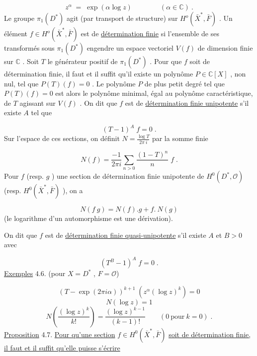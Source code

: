 \begin{equation*}
z^\alpha \;=\; \exp(\alpha \log z) \qquad\qquad (\alpha \in \mathbb{C}) \ .
\end{equation*}
Le groupe $\pi_1(D^*)$ agit (par transport de structure) sur $H^o(\bar{X}^*, \bar{F})$ . Un élément $f \in H^o(\bar{X}^*, \bar{F})$ est de \underline{détermination finie} si l'ensemble de ses transformés sous $\pi_1(D^*)$ engendre un espace vectoriel $V(f)$ de dimension finie sur $\mathbb{C}$ . Soit $T$ le générateur positif de $\pi_1(D^*)$ . Pour que $f$ soit de détermination finie,
il faut et il suffit qu'il existe un polynôme $P \in \mathbb{C}[X]$ , non nul, tel que $P(T)(f) = 0$ . Le polynôme $P$ de plus petit degré tel que $P(T)(f) = 0$ est alors le polynôme minimal, égal au polynôme caractéristique, de $T$ agissant sur $V(f)$ . On dit que $f$ est de \underline{détermination finie unipotente} s'il existe $A$ tel que

\begin{equation*}
(T-1)^A \; f = 0 \; .
\end{equation*}
Sur l'espace de ces sections, on définit $N = \frac{\log T}{2\pi\ i}$ par la somme finie

\begin{equation*}
N(f) = \frac{-1}{2\pi i} \sum_{n > 0} \frac{(1-T)^n}{n} \; f \; .
\end{equation*}
Pour $f$ (resp. $g$ ) une section de détermination finie unipotente de $H^0(D^*, \mathcal{O})$ (resp. $H^0(\bar{X}^*, \bar{F})$ ), on a

\begin{equation*}
N(f\ g) = N(f).g + f.\ N(g)
\end{equation*}
(le logarithme d'un automorphisme est une dérivation).

On dit que $f$ est de \underline{détermination finie quasi-unipotente} s'il existe $A$ et $B > 0$ avec

\begin{equation*}
(T^B - 1)^A \; f = 0 \; .
\end{equation*}
\underline{Exemples} 4.6. (pour $X = D^*$ , $F = \mathcal{O}$)

\begin{equation*}
(T - \exp(2\pi i\alpha))^{k+1} \; (z^{\alpha}(\log z)^k) = 0
\end{equation*}
\begin{equation*}
N(\log z) = 1
\end{equation*}
\begin{equation*}
N\left(\frac{(\log z)^k}{k!}\right) = \frac{(\log z)^{k-1}}{(k-1)!} \qquad (0 \ \mbox{pour} \ k = 0) \; .
\end{equation*}
\underline{Proposition} 4.7. \underline{Pour qu'une section} $f \in H^0(\bar{X}^*, \bar{F})$ \underline{soit de détermination finie, il faut et il suffit qu'elle puisse s'écrire}

